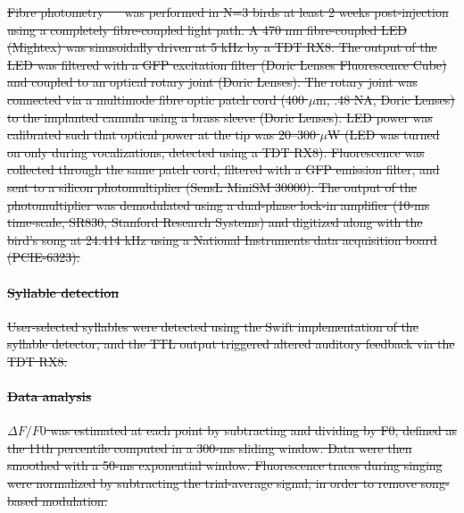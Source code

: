 \documentclass[10pt,letterpaper]{article}
\renewcommand{\subsubsection}[1]{\paragraph{#1}}
\providecommand{\DIFdeltex}[1]{{\protect\color{red}\sout{#1}}}                      %
\providecommand{\DIFdel}[1]{\texorpdfstring{\DIFdeltex{#1}}{}} %
\begin{document}
\DIFdel{Fibre photometry \mbox{%
\cite{Adelsberger:2005dy,Schulz:2012fv,Cui:2013dq,Adelsberger:2014jd,Gunaydin:2014dh} 
}%
was performed in N=3 birds at least 2 weeks post-injection using a 
completely fibre-coupled light path. A 470 nm fibre-coupled LED (Mightex) 
was sinusoidally driven at 5 kHz by a TDT RX8. The output of the LED 
was filtered with a GFP excitation filter (Doric Lenses Fluorescence Cube) 
and coupled to an optical rotary joint (Doric Lenses). The rotary joint 
was connected via a multimode fibre optic patch cord (400 $\mu$m, .48 NA, 
Doric Lenses) to the implanted cannula using a brass sleeve (Doric Lenses). 
LED power was calibrated such that optical power at the tip was 
20--300 $\mu$W (LED was turned on only during vocalizations, detected using 
a TDT RX8). Fluorescence was collected through the same patch cord, 
filtered with a GFP emission filter, and sent to a silicon photomultiplier 
(SensL MiniSM 30000). The output of the photomultiplier was demodulated 
using a dual-phase lock-in amplifier (10-ms time-scale, SR830, Stanford 
Research Systems) and digitized along with the bird's song at 24.414 kHz 
using a National Instruments data acquisition board (PCIE-6323).
}%

\subsubsection{\DIFdel{Syllable detection}}
\addtocounter{subsubsection}{-1}%

\DIFdel{User-selected syllables were detected using the Swift implementation of the
syllable detector, and the TTL output triggered altered auditory feedback 
via the TDT RX8.
}%

\subsubsection{\DIFdel{Data analysis}}
\addtocounter{subsubsection}{-1}%

\DIFdel{$\Delta F / F0$ was estimated at each point by subtracting and dividing by 
F0, defined as the 11th percentile computed in a 300-ms sliding window. 
Data were then smoothed with a 50-ms exponential window. Fluorescence traces
during singing were normalized by subtracting the trial-average signal, in 
order to remove song-based modulation.
}%
\end{document}
